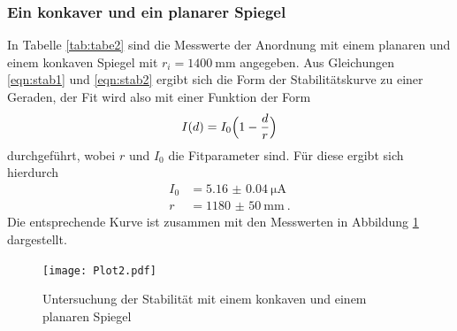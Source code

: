   \subsubsection{Ein konkaver und ein planarer Spiegel}

In Tabelle \ref{tab:tabe2} sind die Messwerte der Anordnung mit einem planaren und einem
konkaven Spiegel mit $r_i = \SI{1400}{\milli\meter}$ angegeben.
Aus Gleichungen \ref{eqn:stab1}
und \ref{eqn:stab2} ergibt sich die Form der Stabilitätskurve zu einer Geraden, der
Fit wird also mit einer Funktion der Form
\begin{equation}
  I(d)= I_0\Bigl(1-\frac{d}{r}\Bigr)
\end{equation}
durchgeführt, wobei $r$ und $I_0$ die Fitparameter sind. Für diese ergibt sich hierdurch
\begin{align*}
  I_0 &= \SI{5.16(4)}{\micro\ampere} \\
  r &=\SI{1180(50)}{\milli\meter} \: .
\end{align*}
Die entsprechende Kurve ist zusammen mit den Messwerten in Abbildung \ref{fig:plot2}
dargestellt.

\begin{minipage}{0.5\textwidth}

\end{minipage}
\begin{minipage}{0.5\textwidth}

\end{minipage}
\begin{figure}
  \centering
  \texttt{[image: Plot2.pdf]}
  \caption{Untersuchung der Stabilität mit einem konkaven und einem planaren Spiegel}
  \label{fig:plot2}
\end{figure}



